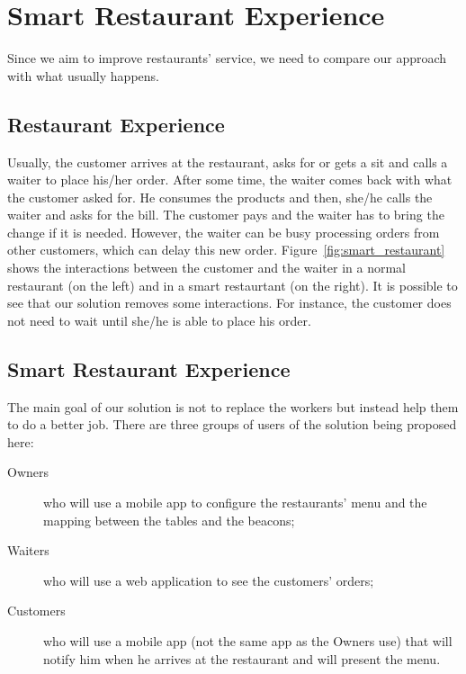 
\section{Smart Restaurant Experience}
\label{sec:smart_restaurant_experience}

Since we aim to improve restaurants' service, we need to compare our approach
with what usually happens.
\subsection{Restaurant Experience}
\label{sub:restaurant_experience}
Usually, the customer arrives at the restaurant, asks for or
gets a sit and calls a waiter
to place his/her order. After some time, the waiter comes back with what
the customer asked for. He consumes the products and then, she/he calls the
waiter and asks for the bill. The customer pays and the waiter has to bring
the change if it is needed.
However, the waiter can be busy processing orders
from other customers, which can delay this new order.
Figure~\ref{fig:smart_restaurant} shows the interactions between the
customer and the waiter in a normal restaurant (on the left) and in
a smart restaurtant (on the right). It is possible to see that our
solution removes some interactions. For instance, the customer does not
need to wait until she/he is able to place his order.

\subsection{Smart Restaurant Experience}
\label{sub:smart_restaurant_experience}

The main goal of our solution is not to replace the workers
but instead help them to do a
better job.
There are three groups of users of the solution being proposed here:

\begin{description}
  \item[Owners] who will use a mobile app to configure the
  restaurants' menu and the mapping between the tables and the beacons;
  \item[Waiters] who will use a web application to see the customers'
  orders;
  \item[Customers] who will use a mobile app (not the same app as the
  Owners use) that will notify him when he arrives at the restaurant and
  will present the menu.
\end{description}

